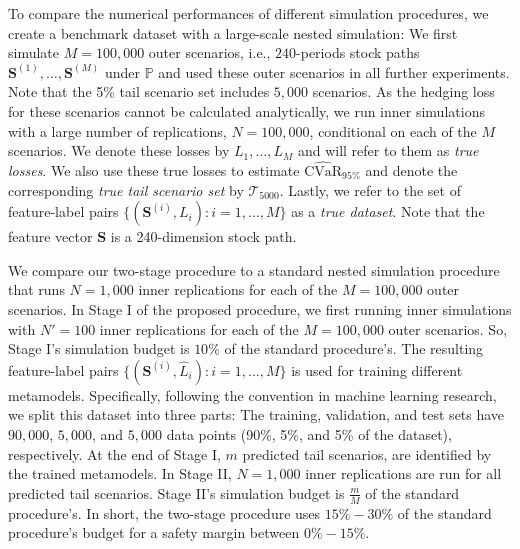 \documentclass[]{article}
\newcommand{\CVaR}{\mbox{CVaR}}
\newcommand{\tail}{\mathcal{T}}
\newcommand{\bS}{\bm{S}}
\newcommand{\Lhat}{\widehat{L}}
\begin{document}
To compare the numerical performances of different simulation procedures, we create a benchmark dataset with a large-scale nested simulation: We first simulate $M=100\!,\!000$ outer scenarios, i.e., $240$-periods stock paths $\bS^{(1)},\ldots,\bS^{(M)}$ under $\mathbb{P}$ and used these outer scenarios in all further experiments.
Note that the 5\% tail scenario set includes $5\!,\!000$ scenarios.
As the hedging loss for these scenarios cannot be calculated analytically, we run inner simulations with a large number of replications, $N=100\!,\!000$, conditional on each of the $M$ scenarios.
We denote these losses by $L_1,\ldots,L_M$ and will refer to them as \textit{true losses}.
We also use these true losses to estimate $\widehat{\CVaR}_{95\%}$ and denote the corresponding \textit{true tail scenario set} by $\tail_{5000}$.
Lastly, we refer to the set of feature-label pairs $\{(\bS^{(i)}, L_i): i=1,\ldots,M\}$ as a \textit{true dataset}.
Note that the feature vector $\bS$ is a 240-dimension stock path.

We compare our two-stage procedure to a standard nested simulation procedure that runs $N=1\!,\!000$ inner replications for each of the $M=100\!,\!000$ outer scenarios.
In Stage I of the proposed procedure, we first running inner simulations with $N'=100$ inner replications for each of the $M=100\!,\!000$ outer scenarios.
So, Stage I's simulation budget is $10\%$ of the standard procedure's.
The resulting feature-label pairs $\{(\bS^{(i)}, \Lhat_i): i=1,\ldots,M\}$ is used for training different  metamodels.
Specifically, following the convention in machine learning research, we split this dataset into three parts: The training, validation, and test sets have $90\!,\!000$, $5\!,\!000$, and $5\!,\!000$ data points (90\%, 5\%, and 5\% of the dataset), respectively.
At the end of Stage I, $m$ predicted tail scenarios, are identified by the trained metamodels.
In Stage II, $N=1\!,\!000$ inner replications are run for all predicted tail scenarios.
Stage II's simulation budget is $\frac{m}{M}$ of the standard procedure's.
In short, the two-stage procedure uses $15\% - 30\%$ of the standard procedure's budget for a safety margin between $0\% - 15\%$.
\end{document}

